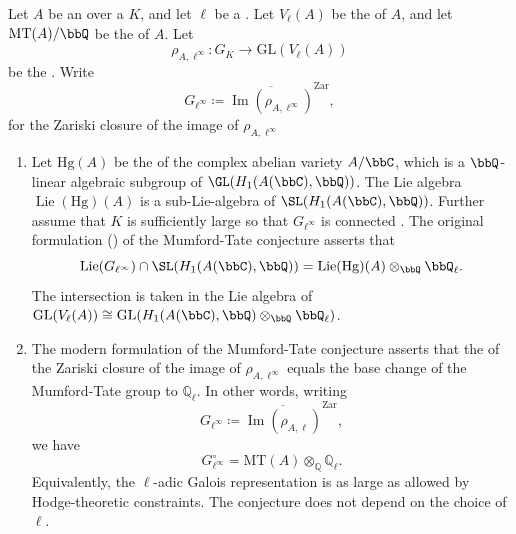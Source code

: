 \begin{conjecture} \label{conjecture:mumford_tate_conjecture_for_an_abelian_variety_over_a_number_field}
Let $A$ be an  over a  $K$, and let $\ell$ be a . Let $V_\ell(A)$ be the  of $A$, and let $\mathrm{MT}(A) / \bbQ$ be the  of $A$. Let
$$\rho_{A,\ell^\infty}: G_K \to \mathrm{GL}(V_\ell(A))$$
be the . 
Write 
$$G_{\ell^\infty} \coloneq \overline{\operatorname{Im}(\rho_{A,\ell^\infty})}^{\text{Zar}},$$
for the Zariski closure of the image of $\rho_{A,\ell^\infty}$

\begin{enumerate}
    \item Let $\mathrm{Hg}(A)$ be the  of the complex abelian variety $A/\bbC$, which is a $\bbQ$-linear algebraic subgroup of $\GL(H_1(A(\bbC), \bbQ))$. The Lie algebra $\operatorname{Lie}(\mathrm{Hg})(A)$ is a sub-Lie-algebra of $\SL(H_1(A(\bbC), \bbQ))$. 
    Further assume that $K$ is sufficiently large so that $G_{\ell^\infty}$ is connected .  
    The original formulation (\cite[Section 4]{mumford_fav}) of the Mumford-Tate conjecture asserts that 
    $$\operatorname{Lie}(G_{\ell^\infty}) \cap \SL(H_1(A(\bbC), \bbQ)) = \operatorname{Lie}(\mathrm{Hg})(A) \otimes_\bbQ \bbQ_\ell.$$
    The intersection is taken in the Lie algebra of $\operatorname{GL}(V_\ell(A)) \cong \operatorname{GL}(H_1(A(\bbC), \bbQ) \otimes_\bbQ \bbQ_\ell)$. 

    \item The modern formulation of the Mumford-Tate conjecture asserts that the  of the Zariski closure of the image of $\rho_{A,\ell^\infty}$ equals the base change of the Mumford-Tate group to $\mathbb{Q}_\ell$. 
    In other words, writing 
    $$G_{\ell^\infty} \coloneq \overline{\operatorname{Im}(\rho_{A,\ell})}^{\text{Zar}},$$
    we have 
    $$G_{\ell^\infty}^\circ = \mathrm{MT}(A) \otimes_\mathbb{Q} \mathbb{Q}_\ell.$$
    Equivalently, the $\ell$-adic Galois representation is as large as allowed by Hodge-theoretic constraints. The conjecture does not depend on the choice of $\ell$.
\end{enumerate}

\end{conjecture}